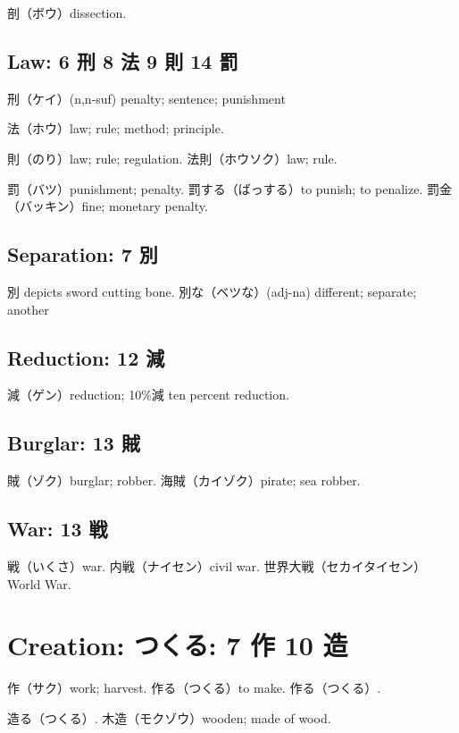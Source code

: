 剖（ボウ）dissection.

\subsection{Law: 6 刑 8 法 9 則 14 罰}

刑（ケイ）(n,n-suf) penalty; sentence; punishment

法（ホウ）law; rule; method; principle.

則（のり）law; rule; regulation.
法則（ホウソク）law; rule.

罰（バツ）punishment; penalty.
罰する（ばっする）to punish; to penalize.
罰金（バッキン）fine; monetary penalty.

\subsection{Separation: 7 別}

別 depicts sword cutting bone.
別な（ベツな）(adj-na) different; separate; another

\subsection{Reduction: 12 減}

減（ゲン）reduction; 10\%減 ten percent reduction.

\subsection{Burglar: 13 賊}

賊（ゾク）burglar; robber.
海賊（カイゾク）pirate; sea robber.

\subsection{War: 13 戦}

戦（いくさ）war.
内戦（ナイセン）civil war.
世界大戦（セカイタイセン）World War.

\section{Creation: つくる: 7 作 10 造}

作（サク）work; harvest.
作る（つくる）to make.
作る（つくる）.

造る（つくる）.
木造（モクゾウ）wooden; made of wood.
